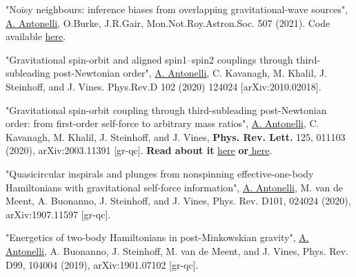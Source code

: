 \documentclass[11pt,a4paper,sans]{moderncv}        %
\begin{document}
	\begin{etaremune}
		\item "Noisy neighbours: inference biases from overlapping gravitational-wave sources", \underline{A. Antonelli}, O.Burke,  J.R.Gair, Mon.Not.Roy.Astron.Soc. 507 (2021). Code available 	{\color{blue}\href{https://github.com/aantonelli94/GWOP}{here}}.
		\item "Gravitational spin-orbit and aligned spin1–spin2 couplings through third-subleading post-Newtonian order", \underline{A. Antonelli}, C. Kavanagh, M. Khalil, J. Steinhoff,
		and J. Vines. Phys.Rev.D 102 (2020) 124024 [arXiv:2010.02018].
	\item "Gravitational spin-orbit coupling through third-subleading post-Newtonian order: from first-order self-force to arbitrary mass ratios", \underline{A. Antonelli}, C. Kavanagh, M. Khalil, J. Steinhoff,
and J. Vines, \textbf{Phys. Rev. Lett.} 125, 011103 (2020),
arXiv:2003.11391 [gr-qc]. \textbf{Read about it} {\color{blue}\href{https://physics.aps.org/articles/v13/116}{here}}\textbf{ or}{\color{blue}\href{https://www.aei.mpg.de/527876/particle-physics-inspired-techniques-improve-the-accuracy-of-spin-effects-in-gravitational-waveform-models?c=26149}{ here}}.

\vspace{5pt}
	\item "Quasicircular inspirals and plunges from nonspinning effective-one-body Hamiltonians with gravitational self-force information", \underline{A. Antonelli}, M. van de Meent, A. Buonanno, J. Steinhoff, and J. Vines, Phys. Rev. D101, 024024 (2020),
arXiv:1907.11597 [gr-qc]. 
\vspace{5pt}%
	\item "Energetics of two-body Hamiltonians in post-Minkowskian gravity", \underline{A. Antonelli}, A. Buonanno, J. Steinhoff, M. van de
Meent, and J. Vines, Phys. Rev. D99, 104004 (2019),
arXiv:1901.07102 [gr-qc].
	\end{etaremune}	

	
%
%			
\end{document}
